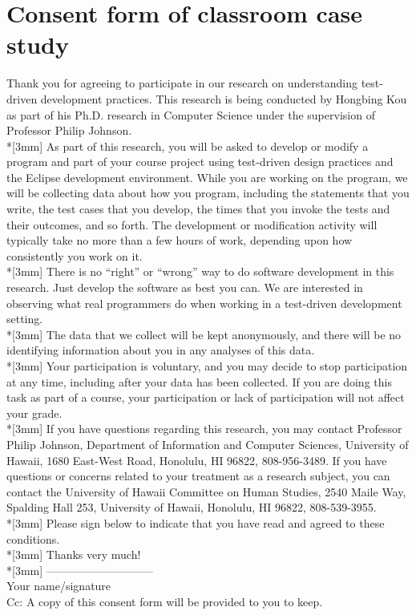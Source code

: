 \appendix
\chapter{Consent form of classroom case study}
\label{app:consent}
\noindent Thank you for agreeing to participate in our research on
understanding test-driven development practices. This research is being
conducted by Hongbing Kou as part of his Ph.D. research in Computer Science
under the supervision of Professor Philip Johnson.\\*[3mm]
As part of this research, you will be asked to develop or modify a program
and part of your course project using test-driven design practices and the
Eclipse development environment. While you are working on the program, we
will be collecting data about how you program, including the statements
that you write, the test cases that you develop, the times that you invoke
the tests and their outcomes, and so forth.  The development or
modification activity will typically take no more than a few hours of work,
depending upon how consistently you work on it.\\*[3mm]
There is no ``right'' or ``wrong'' way to do software development in this
research. Just develop the software as best you can. We are interested in
observing what real programmers do when working in a test-driven
development setting.\\*[3mm]
The data that we collect will be kept anonymously, and there will be no
identifying information about you in any analyses of this data.\\*[3mm]
Your participation is voluntary, and you may decide to stop participation
at any time, including after your data has been collected.  If you are
doing this task as part of a course, your participation or lack of
participation will not affect your grade.\\*[3mm]
If you have questions regarding this research, you may contact Professor
Philip Johnson, Department of Information and Computer Sciences, University
of Hawaii, 1680 East-West Road, Honolulu, HI 96822, 808-956-3489.  If you
have questions or concerns related to your treatment as a research subject,
you can contact the University of Hawaii Committee on Human Studies, 2540
Maile Way, Spalding Hall 253, University of Hawaii, Honolulu, HI 96822,
808-539-3955. \\*[3mm]
Please sign below to indicate that you have read and agreed to these
conditions.\\*[3mm]
Thanks very much! \\*[3mm]
----------------------------- \\
Your name/signature\\
Cc: A copy of this consent form will be provided to you to keep.


